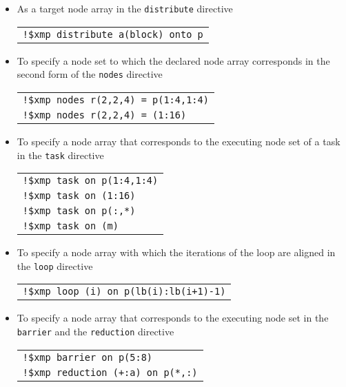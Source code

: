 \begin{itemize}
\item As a target node array in the {\tt distribute} directive

\begin{tabular}{l}
\verb|!$xmp distribute a(block) onto p| \\
\end{tabular}%

\item To specify a node set to which the declared node array corresponds
      in the second form of the {\tt nodes} directive

\begin{tabular}{l}
\verb|!$xmp nodes r(2,2,4) = p(1:4,1:4)| \\
\verb|!$xmp nodes r(2,2,4) = (1:16)| \\
\end{tabular}

\item To specify a node array that corresponds to the executing node set
      of a task in the {\tt task} directive

\begin{tabular}{l}
\verb|!$xmp task on p(1:4,1:4)| \\
\verb|!$xmp task on (1:16)| \\
\verb|!$xmp task on p(:,*)| \\
\verb|!$xmp task on (m)| \\
\end{tabular}

\item To specify a node array with which the iterations of the loop are
      aligned in the {\tt loop} directive


\begin{tabular}{l}
\verb|!$xmp loop (i) on p(lb(i):lb(i+1)-1)| \\
\end{tabular}%

\item To specify a node array that corresponds to the executing node set
      in the {\tt barrier} and the {\tt reduction} directive


\begin{tabular}{l}
\verb|!$xmp barrier on p(5:8)| \\
\verb|!$xmp reduction (+:a) on p(*,:)| \\
\end{tabular}


\end{itemize}
